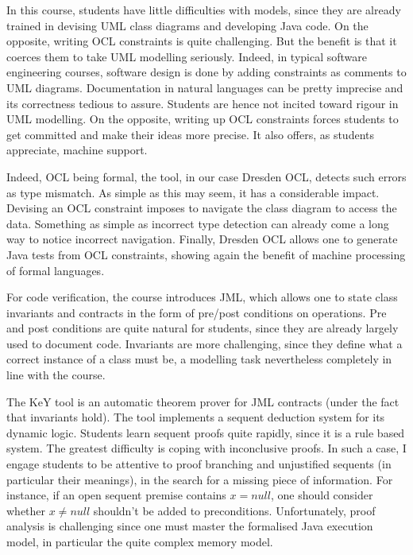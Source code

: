 \documentclass[a4paper,UKenglish]{lipics}
\begin{document}
In this course, students have little difficulties with models, since they are already trained in devising UML class diagrams and developing Java code. On the opposite, writing OCL constraints is quite challenging. But the benefit is that it coerces them to take UML modelling seriously. Indeed, in typical software engineering courses, software design is done by adding constraints as comments to UML diagrams. Documentation in natural languages can be pretty imprecise and its correctness tedious to assure. Students are hence not incited toward rigour in UML modelling. On the opposite, writing up OCL constraints forces students to get committed and make their ideas more precise. It also offers, as students appreciate, machine support.

Indeed, OCL being formal, the tool, in our case Dresden OCL, detects such errors as type mismatch. As simple as this may seem, it has a considerable impact. Devising an OCL constraint imposes to navigate the class diagram to access the data. Something as simple as incorrect type detection can already come a long way to notice incorrect navigation. Finally, Dresden OCL allows one to generate Java tests from OCL constraints, showing again the benefit of machine processing of formal languages.

For code verification, the course introduces JML, which allows one to state class invariants and contracts in the form of pre/post conditions on operations. Pre and post conditions are quite natural for students, since they are already largely used to document code. Invariants are more challenging, since they define what a correct instance of a class must be, a modelling task nevertheless completely in line with the course.

The KeY tool is an automatic theorem prover for JML contracts (under the fact that invariants hold). The tool implements a sequent deduction system for its dynamic logic. Students learn sequent proofs quite rapidly, since it is a rule based system. The greatest difficulty is coping with inconclusive proofs. In such a case, I engage students to be attentive to proof branching and unjustified sequents (in particular their meanings), in the search for a missing piece of information. For instance, if an open sequent premise contains $x=null$, one should consider whether $x\not=null$ shouldn't be added to preconditions. Unfortunately, proof analysis is challenging since one must master the formalised Java execution model, in particular the quite complex memory model.
\end{document}
